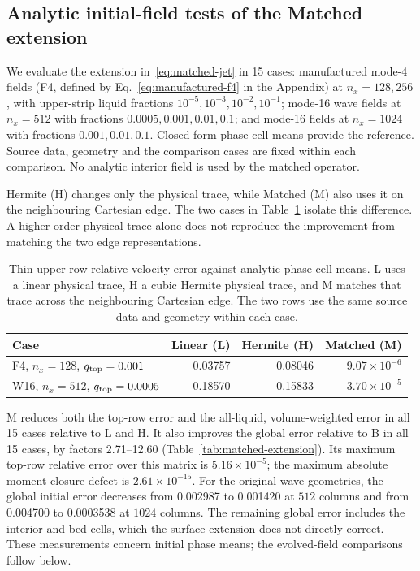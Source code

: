 \documentclass[10pt]{article}
\begin{document}
\subsection{Analytic initial-field tests of the Matched extension}
We evaluate the extension in~\eqref{eq:matched-jet} in 15 cases:
manufactured mode-4 fields (F4, defined by
Eq.~\eqref{eq:manufactured-f4} in the Appendix) at $n_x=128,256$, with upper-strip liquid
fractions $10^{-5},10^{-3},10^{-2},10^{-1}$; mode-16 wave fields at
$n_x=512$ with fractions $0.0005,0.001,0.01,0.1$; and mode-16 fields at
$n_x=1024$ with fractions $0.001,0.01,0.1$. Closed-form phase-cell means
provide the reference. Source data, geometry and the comparison cases
are fixed within each comparison. No analytic interior field is used by
the matched operator.

Hermite (H) changes only the physical trace, while Matched (M) also uses
it on the neighbouring Cartesian edge. The two cases in
Table~\ref{tab:lhm-ablation} isolate this difference. A higher-order
physical trace alone does not reproduce the improvement from matching the
two edge representations.

\begin{table}[htbp]\centering\small
\caption{Thin upper-row relative velocity error against analytic phase-cell
means. L uses a linear physical trace, H a cubic Hermite physical trace,
and M matches that trace across the neighbouring Cartesian edge.
The two rows use the same source data and geometry within each case.}
\label{tab:lhm-ablation}
\begin{tabular}{@{}lrrr@{}}\toprule
Case & Linear (L) & Hermite (H) & Matched (M)\\\midrule
F4, $n_x=128$, $q_{\rm top}=0.001$ & 0.03757 & 0.08046 & $9.07\times10^{-6}$\\
W16, $n_x=512$, $q_{\rm top}=0.0005$ & 0.18570 & 0.15833 & $3.70\times10^{-5}$\\
\bottomrule\end{tabular}
\end{table}

M reduces both the top-row error and the all-liquid, volume-weighted error
in all 15 cases relative to L and H. It also improves the global error
relative to B in all 15 cases,
by factors 2.71--12.60 (Table~\ref{tab:matched-extension}). Its maximum
top-row relative error over this matrix is $5.16\times10^{-5}$; the maximum
absolute moment-closure defect is $2.61\times10^{-15}$.
For the original wave geometries, the global initial error decreases from
0.002987 to 0.001420 at $512$ columns and from 0.004700 to 0.0003538 at
$1024$ columns. The remaining global error includes the interior and bed
cells, which the surface extension does not directly correct. These
measurements concern initial phase means; the evolved-field comparisons
follow below.
\end{document}
